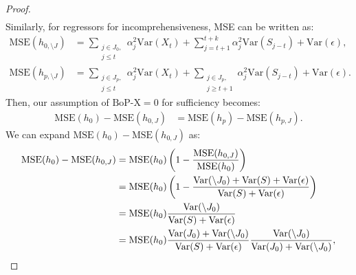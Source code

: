 \begin{proof}
\begin{align}
    \end{align}
    Similarly, for regressors for incomprehensiveness, MSE can be written as: 
    \begin{align}
        \text{MSE}(h_{0,\setminus J}) &=  \sum_{\substack{j \in J_0, \\ j \leq t}}\alpha_j^2 \text{Var}(X_{t})  +  \sum_{j=t+1}^{t+k} \alpha_j^2 \text{Var}(S_{j-t}) + \text{Var} (\epsilon), \\ 
        \text{MSE}(h_{p,\setminus J}) &= \sum_{\substack{j \in J_p, \\ j \leq t}}\alpha_j^2 \text{Var}(X_{t}) + \sum_{\substack{j \in  J_p, \\ j \geq t+1}}\alpha_j^2 \text{Var}(S_{j-t}) + \text{Var} (\epsilon).
    \end{align}
    Then, our assumption of $\text{BoP-X} = 0$ for sufficiency becomes: 
    \begin{align} 
         \text{MSE}(h_0) - \text{MSE}(h_{0,J}) &= \text{MSE}(h_p) - \text{MSE}(h_{p,J}). \label{eqn:mse_suff}
     \end{align}
     We can expand $\text{MSE}(h_0) - \text{MSE}(h_{0,J}) $ as: 
     \begin{align}
          \text{MSE}(h_0) - \text{MSE}(h_{0,J}) &= \text{MSE}(h_0) \left( 1- \frac{\text{MSE}(h_{0,J})}{\text{MSE}(h_0)} \right)  \nonumber \\
          &=  \text{MSE}(h_0) \left( 1- \frac{\text{Var}(\setminus J_0) + \text{Var}(S) + \text{Var} (\epsilon)}{\text{Var}(S) + \text{Var}(\epsilon)} \right) \nonumber \\ 
&=  \text{MSE}(h_0) \frac{\text{Var}(\setminus J_0)}{\text{Var}(S) + \text{Var}(\epsilon)} \nonumber \\     
&= \text{MSE}(h_0)  \frac{\text{Var}(J_0) + \text{Var}(\setminus J_0)}{\text{Var}(S) + \text{Var}(\epsilon)} \frac{\text{Var}(\setminus J_0) }{\text{Var}(J_0) + \text{Var}(\setminus J_0)}, \label{eqn:h_0_suff} 
\end{align}


\end{proof}
